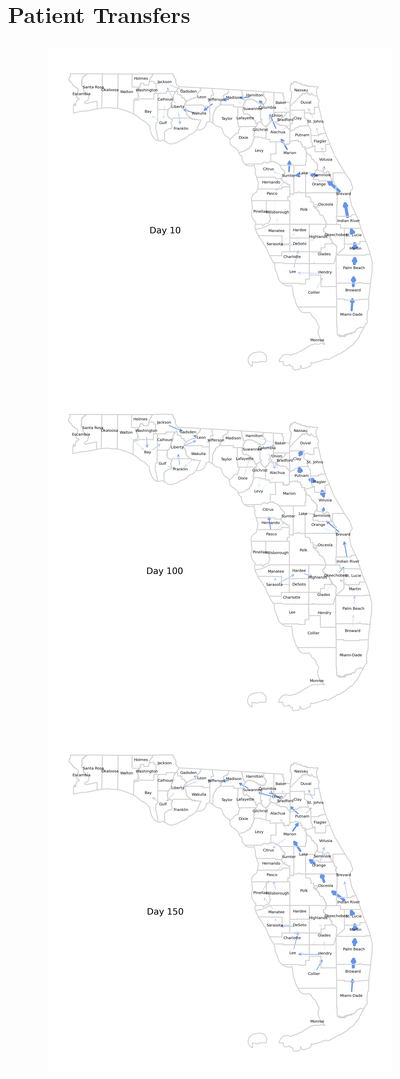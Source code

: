 \documentclass{article}
\begin{document}
\subsection{Patient Transfers}


\begin{figure}
    \centering
    \includegraphics[width=0.43\linewidth]{pics/paperStackedPatientTransfersVax0.1.png}

\end{figure}
\end{document}
